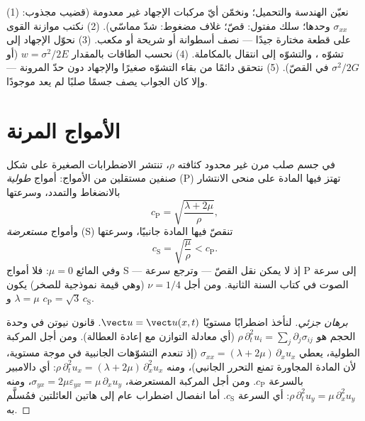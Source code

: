 \begin{method}\label{met:b3:continuum-elasticity:method}
(1) نعيّن الهندسة والتحميل؛ ونخمّن أيّ مركبات الإجهاد غير
معدومة (قضيب مجذوب: $\sigma_{xx}$ وحدها؛ سلك مفتول: قصّ؛ غلاف
مضغوط: شدّ مماسّي). (2) نكتب موازنة القوى على قطعة مختارة جيدًا
--- نصف أسطوانة أو شريحة أو مكعب. (3) نحوّل الإجهاد إلى تشوّه
، والتشوّه إلى انتقال بالمكاملة. (4) نحسب الطاقات
بالمقدار $w = \sigma^2/2E$ (أو $\sigma^2/2G$ في القصّ). (5) نتحقق
دائمًا من بقاء التشوّه صغيرًا والإجهاد دون حدّ المرونة ---
وإلا كان الجواب يصف جسمًا صلبًا لم يعد موجودًا.
\end{method}

\section{الأمواج المرنة}

\begin{proposition}\label{prop:b3:continuum-elasticity:waves}
في جسم صلب مرن غير محدود كثافته $\rho$، تنتشر الاضطرابات الصغيرة
على شكل صنفين مستقلين من الأمواج: أمواج \emph{طولية} (P) تهتز
فيها المادة على منحى الانتشار بالانضغاط والتمدد، وسرعتها
\[
c_{\text{P}} = \sqrt{\frac{\lambda + 2\mu}{\rho}} ,
\]
وأمواج \emph{مستعرضة} (S) تنقصّ فيها المادة جانبيًا، وسرعتها
\[
c_{\text{S}} = \sqrt{\frac{\mu}{\rho}} < c_{\text{P}} .
\]
وفي المائع $\mu = 0$: فلا أمواج S --- إذ لا يمكن نقل القصّ ---
وترجع سرعة P إلى سرعة الصوت في كتاب السنة الثانية. ومن أجل
$\nu = 1/4$ (وهي قيمة نموذجية للصخر) يكون $\lambda = \mu$ و $c_{\text{P}} =
\sqrt3\,c_{\text{S}}$.
\end{proposition}

\begin{proof}[برهان جزئي]
لنأخذ اضطرابًا مستويًا $\vect u = \vect u(x, t)$. قانون نيوتن في
وحدة الحجم هو $\rho\,\partial_t^2u_i = \sum_j\partial_j\sigma_{ij}$
(أي معادلة التوازن مع إعادة العطالة). ومن أجل المركبة الطولية،
يعطي  $\sigma_{xx} = (\lambda +
2\mu)\,\partial_xu_x$ (إذ تنعدم التشوّهات الجانبية في موجة
مستوية، لأن المادة المجاورة تمنع التحرر الجانبي)، ومنه
$\rho\,\partial_t^2u_x = (\lambda + 2\mu)\,\partial_x^2u_x$: أي
دالامبير بالسرعة $c_{\text{P}}$. ومن أجل المركبة المستعرضة،
$\sigma_{yx} =
2\mu\varepsilon_{yx} = \mu\,\partial_xu_y$، ومنه
$\rho\,\partial_t^2u_y = \mu\,\partial_x^2u_y$: أي السرعة $c_{\text{S}}$.
أما انفصال اضطراب عام إلى هاتين العائلتين فمُسلَّم به.
\end{proof}

